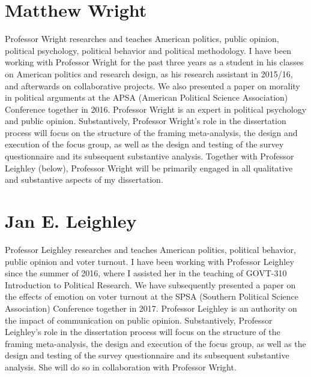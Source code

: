 \documentclass[11pt]{article}
\begin{document}
\section*{Matthew Wright}

\vspace{0.3cm}

Professor Wright researches and teaches American politics, public opinion, political psychology, political behavior and political methodology. I have been working with Professor Wright for the past three years as a student in his classes on American politics and research design, as his research assistant in 2015/16, and afterwards on collaborative projects. We also presented a paper on morality in political arguments at the APSA (American Political Science Association) Conference together in 2016. Professor Wright is an expert in political psychology and public opinion. Substantively, Professor Wright's role in the dissertation process will focus on the structure of the framing meta-analysis, the design and execution of the focus group, as well as the design and testing of the survey questionnaire and its subsequent substantive analysis. Together with Professor Leighley (below), Professor Wright will be primarily engaged in all qualitative and substantive aspects of my dissertation.

\section*{Jan E. Leighley}

\vspace{0.3cm}

Professor Leighley researches and teaches American politics, political behavior, public opinion and voter turnout. I have been working with Professor Leighley since the summer of 2016, where I assisted her in the teaching of GOVT-310 Introduction to Political Research. We have subsequently presented a paper on the effects of emotion on voter turnout at the SPSA (Southern Political Science Association) Conference together in 2017. Professor Leighley is an authority on the impact of communication on public opinion. Substantively, Professor Leighley's role in the dissertation process will focus on the structure of the framing meta-analysis, the design and execution of the focus group, as well as the design and testing of the survey questionnaire and its subsequent substantive analysis. She will do so in collaboration with Professor Wright.
\end{document}

